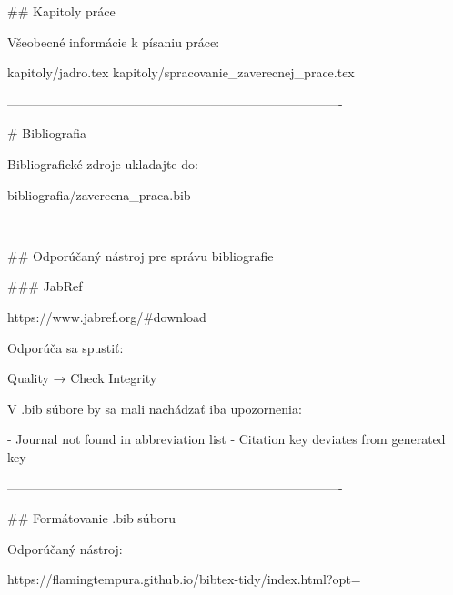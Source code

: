 ## Kapitoly práce

Všeobecné informácie k písaniu práce:

kapitoly/jadro.tex  
kapitoly/spracovanie_zaverecnej_prace.tex

-------------------------------------------------------------------------------

# Bibliografia

Bibliografické zdroje ukladajte do:

bibliografia/zaverecna_praca.bib

-------------------------------------------------------------------------------

## Odporúčaný nástroj pre správu bibliografie

### JabRef

https://www.jabref.org/#download

Odporúča sa spustiť:

Quality → Check Integrity

V .bib súbore by sa mali nachádzať iba upozornenia:

- Journal not found in abbreviation list
- Citation key deviates from generated key

-------------------------------------------------------------------------------

## Formátovanie .bib súboru

Odporúčaný nástroj:

https://flamingtempura.github.io/bibtex-tidy/index.html?opt=%

